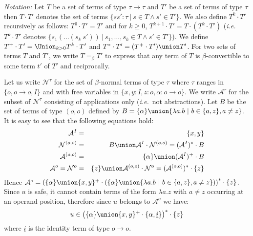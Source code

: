 \emph{Notation:} Let $T$ be a set of terms of type $\tau \rightarrow
\tau$ and $T'$ be a set of terms of type $\tau$ then $T \cdot T'$
denotes the set of terms $\{ s s' : \tau \ | \ s \in T \wedge s' \in
T' \}$. We also define $T^k \cdot T'$ recursively as follows:  $T^0
\cdot T' = T'$ and for $k\geq 0$, $T^{k+1} \cdot T' = T \cdot (T^k
\cdot T')$ ({\it i.e.}~$T^k \cdot T'$ denotes $\{ s_1( \ldots
(s_k~s'))  \ | \ s_1, \ldots, s_k \in T \wedge s' \in T' \}$). We
define $T^+\cdot T' = \Union_{k > 0} T^k \cdot T'$ and $T^*\cdot T'
= (T^+\cdot T') \union T'$. For two sets of terms $T$ and $T'$, we
write $T =_\beta T'$ to express that any term of $T$ is
$\beta$-convertible to some term $t'$ of $T'$ and reciprocally.

Let us write $\mathcal{N}^\tau$ for the set of $\beta$-normal terms
of type $\tau$ where $\tau$ ranges in $\{ o, o\rightarrow o, I \}$
and with free variables in $\{ x,y:I, z:o, \alpha:o\rightarrow o\}$.
We write $\mathcal{A}^\tau$ for the subset of $\mathcal{N}^\tau$
consisting of applications only ({\it i.e.}~not abstractions). Let
$B$ be the set of terms of type $(o,o)$ defined by $B = \{ \alpha \}
\union \{ \lambda a.b \ | \ b \in \{a,z\}, a \neq z \}$. It is easy
to see that the following equations hold:
\begin{eqnarray*}
\mathcal{A}^I &=& \{ x,y \} \\
\mathcal{N}^{(o,o)} &=& B \union \mathcal{A}^I \cdot
\mathcal{N}^{(o,o)} = (\mathcal{A}^I)^* \cdot B \\
\mathcal{A}^{(o,o)} &=& \{ \alpha \} \union (\mathcal{A}^I)^+ \cdot B \\
\mathcal{A}^o = \mathcal{N}^o &=& \{ z \} \union \mathcal{A}^{(o,o)} \cdot \mathcal{N}^o = (\mathcal{A}^{(o,o)})^* \cdot \{ z \}
\end{eqnarray*}
Hence $\mathcal{A}^o = \left( \{\alpha \} \union \{x,y\}^+ \cdot
\left( \{\alpha \} \union \{\lambda a.b \ | \ b \in \{a,z\}, a \neq
z \} \right) \right)^* \cdot \{ z \}$. Since $u$ is safe, it cannot
contain terms of the form $\lambda a . z$ with $a \neq z$ occurring
at an operand position, therefore since $u$ belongs to
$\mathcal{A}^o$ we have:
\begin{equation}
u \in \left( \{\alpha\} \union \{x,y\}^+ \cdot \{\alpha,
\underline{i} \} \right)^* \cdot \{ z \} \label{eqn:u}
\end{equation}
where $\underline{i}$ is the identity term of type $o\rightarrow o$.


